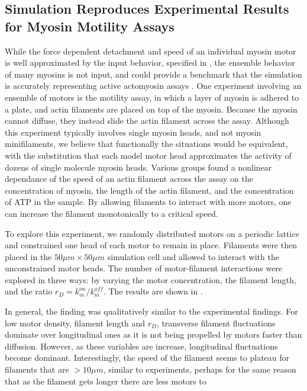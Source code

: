 \documentclass[12pt]{article}
\begin{document}
\subsection{Simulation Reproduces Experimental Results for Myosin Motility Assays}
While the force dependent detachment and speed of an individual myosin motor is well approximated by
the input behavior, specified in , the ensemble behavior of many
myosins is not input, and could provide a benchmark that the simulation is accurately representing active actomyosin
assays \cite{walcott2012}. One experiment involving an ensemble of motors is the motility assay, in which a layer of myosin is
adhered to a plate, and actin filaments are placed on top of the myosin. Because the myosin cannot diffuse, they instead
slide the actin filament across the assay.
Although this experiment typically involves single myosin heads, and not myosin minifilaments, we believe that
functionally the situations would be equivalent, with the substitution that each model motor head approximates the
activity of dozens of single molecule myosin heads. 
Various groups \cite{harris1993, umemoto1990} found a
nonlinear dependance of the speed of an actin filament across the assay on the concentration of myosin, the length of
the actin filament, and the concentration of ATP in the sample. By allowing filaments to interact with more motors, one
can increase the filament monotonically to a critical speed. 
\par
To explore this experiment, we randomly distributed motors on a periodic lattice and
constrained one head of each motor to remain in place. Filaments were then placed in the $50\mu m\times50\mu m$ simulation cell and 
allowed to interact with the unconstrained motor heads. The number of motor-filament interactions were explored in three
ways: by varying the motor concentration, the filament length, and the ratio $r_D = k_m^{on}/k_m^{off}$. 
The results are shown in . 
\par
In general, the finding was qualitatively similar to the experimental findings. 
For low motor density, filament length and $r_D$, transverse filament fluctuations dominate over longitudinal ones as
it is not being propelled by motors faster than diffusion. However, as these variables are increase, longitudinal
fluctuations become dominant. Interestingly, the speed of the filament seems to plateau for filaments that are $>10\mu
m$, similar to experiments, perhaps for the same reason that as the filament gets longer there are less motors to
\end{document}
